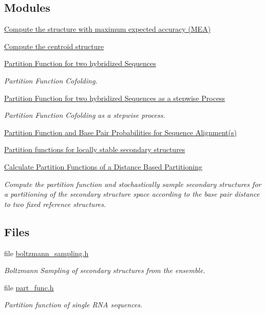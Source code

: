 \subsection*{Modules}
\begin{DoxyCompactItemize}
\item 
\hyperlink{group__mea__fold}{Compute the structure with maximum expected accuracy (\-M\-E\-A)}
\item 
\hyperlink{group__centroid__fold}{Compute the centroid structure}
\item 
\hyperlink{group__pf__cofold}{Partition Function for two hybridized Sequences}
\begin{DoxyCompactList}\small\item\em Partition Function Cofolding. \end{DoxyCompactList}\item 
\hyperlink{group__up__cofold}{Partition Function for two hybridized Sequences as a stepwise Process}
\begin{DoxyCompactList}\small\item\em Partition Function Cofolding as a stepwise process. \end{DoxyCompactList}\item 
\hyperlink{group__consensus__pf__fold}{Partition Function and Base Pair Probabilities for Sequence Alignment(s)}
\item 
\hyperlink{group__local__pf__fold}{Partition functions for locally stable secondary structures}
\item 
\hyperlink{group__kl__neighborhood__pf}{Calculate Partition Functions of a Distance Based Partitioning}
\begin{DoxyCompactList}\small\item\em Compute the partition function and stochastically sample secondary structures for a partitioning of the secondary structure space according to the base pair distance to two fixed reference structures. \end{DoxyCompactList}\end{DoxyCompactItemize}
\subsection*{Files}
\begin{DoxyCompactItemize}
\item 
file \hyperlink{boltzmann__sampling_8h}{boltzmann\-\_\-sampling.\-h}
\begin{DoxyCompactList}\small\item\em Boltzmann Sampling of secondary structures from the ensemble. \end{DoxyCompactList}\item 
file \hyperlink{part__func_8h}{part\-\_\-func.\-h}
\begin{DoxyCompactList}\small\item\em Partition function of single R\-N\-A sequences. \end{DoxyCompactList}\end{DoxyCompactItemize}
